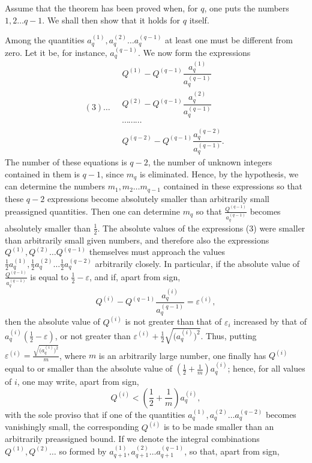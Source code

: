 \documentclass[10pt]{article}
\begin{document}
Assume that the theorem has been proved when, for \(q\), one puts the numbers \(1,2\ldots q-1\). We shall then show that it holds for \(q\) itself.

Among the quantities \(a_q^{(1)},a_q^{(2)}\ldots a_q^{(q-1)}\) at least one must be different from zero. Let it be, for instance, \(a_q^{(q-1)}\). We now form the expressions
\[
(3)\ldots\quad
\begin{array}{c}
Q^{(1)}-Q^{(q-1)}\dfrac{a_q^{(1)}}{a_q^{(q-1)}}\\[0.45em]
Q^{(2)}-Q^{(q-1)}\dfrac{a_q^{(2)}}{a_q^{(q-1)}}\\[-0.1em]
\cdots\cdots\cdots\\[0.25em]
Q^{(q-2)}-Q^{(q-1)}\dfrac{a_q^{(q-2)}}{a_q^{(q-1)}}.
\end{array}
\]
The number of these equations is \(q-2\), the number of unknown integers contained in them is \(q-1\), since \(m_q\) is eliminated. Hence, by the hypothesis, we can determine the numbers \(m_1,m_2\ldots m_{q-1}\) contained in these expressions so that these \(q-2\) expressions become absolutely smaller than arbitrarily small preassigned quantities. Then one can determine \(m_q\) so that \(\frac{Q^{(q-1)}}{a_q^{(q-1)}}\) becomes absolutely smaller than \(\frac12\). The absolute values of the expressions (3) were smaller than arbitrarily small given numbers, and therefore also the expressions \(Q^{(1)},Q^{(2)}\ldots Q^{(q-1)}\) themselves must approach the values \(\frac12a_q^{(1)},\frac12a_q^{(2)}\ldots\frac12a_q^{(q-2)}\) arbitrarily closely. In particular, if the absolute value of \(\frac{Q^{(q-1)}}{a_q^{(q-1)}}\) is equal to \(\frac12-\varepsilon\), and if, apart from sign,
\[
Q^{(i)}-Q^{(q-1)}\frac{a_q^{(i)}}{a_q^{(q-1)}}=\varepsilon^{(i)},
\]
then the absolute value of \(Q^{(i)}\) is not greater than that of \(\varepsilon_i\) increased by that of \(a_q^{(i)}\left(\frac12-\varepsilon\right)\), or not greater than \(\varepsilon^{(i)}+\frac12\sqrt{\bigl(a_q^{(i)}\bigr)^2}\). Thus, putting \(\varepsilon^{(i)}=\frac{\sqrt{\bigl(a_q^{(i)}\bigr)^2}}{m}\), where \(m\) is an arbitrarily large number, one finally has \(Q^{(i)}\) equal to or smaller than the absolute value of \(\left(\frac12+\frac1m\right)a_q^{(i)}\); hence, for all values of \(i\), one may write, apart from sign,
\[
Q^{(i)}<\left(\frac12+\frac1m\right)a_q^{(i)},
\]
with the sole proviso that if one of the quantities \(a_q^{(1)},a_q^{(2)}\ldots a_q^{(q-2)}\) becomes vanishingly small, the corresponding \(Q^{(i)}\) is to be made smaller than an arbitrarily preassigned bound. If we denote the integral combinations \(Q^{(1)},Q^{(2)}\ldots\) so formed by \(a_{q+1}^{(1)},a_{q+1}^{(2)}\ldots a_{q+1}^{(q-1)}\), so that, apart from sign,
\end{document}
